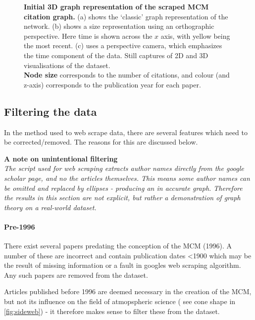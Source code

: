 \begin{figure}[H]
        \caption{ \textbf{Initial 3D graph representation of the scraped MCM citation graph.} (a) shows the `classic' graph representation of the network. (b) shows a size representation using an orthographic perspective. Here time is shown across the $x$ axis, with yellow being the most recent. (c)
        uses a perspective camera, which emphasizes the time component of the data. 
        Still captures of 2D and 3D visualisations of the dataset.\\ 
         \textbf{Node size} corresponds to the number of citations, and colour (and z-axis) corresponds to the publication year for each paper.}
        \label{fig:weball}

\end{figure}


\subsection{Filtering the data}\label{sec:filter3d}


In the method used to web scrape data, there are several features which need to be corrected/removed. The reasons for this are discussed below.
 
 
\textbf{A note on unintentional filtering}\\
\textit{
The script used for web scraping extracts author names directly from the google scholar page, and no the articles themselves. This means some author names can be omitted and replaced by ellipses - producing an in accurate graph. Therefore the results in this section are not explicit, but rather a demonstration of graph theory on a real-world dataset.
}

 
\paragraph*{Pre-1996}
There exist several papers predating the conception of the MCM (1996). A number of these are incorrect and contain publication dates <1900 which may be the result of missing information or a fault in googles web scraping algorithm. Any such papers are removed from the dataset.

Articles published before 1996 are deemed necessary in the creation of the MCM, but not its influence on the field of atmopspheric science ( see cone shape in \autoref{fig:sideweb}) - it therefore makes sense to filter these from the dataset. 
 

